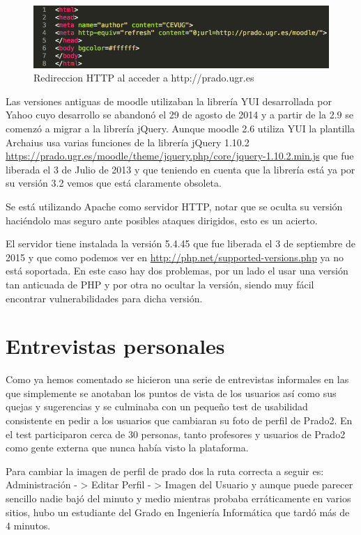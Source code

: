 \begin{figure}
\centering
\includegraphics[width=1.0\textwidth]{../screenshots/redireccionhttp}
\caption{Redireccion HTTP al acceder a http://prado.ugr.es}
\label{redireccionhttp}
\end{figure}

\bigskip
Las versiones antiguas de moodle utilizaban la librería YUI desarrollada por Yahoo cuyo desarrollo se abandonó el 29 de agosto de 2014 \cite{art_01} y a partir de la 2.9 se comenzó a migrar a la librería jQuery. Aunque moodle 2.6 utiliza YUI la plantilla Archaius usa varias funciones de la librería jQuery 1.10.2 \url{https://prado.ugr.es/moodle/theme/jquery.php/core/jquery-1.10.2.min.js} que fue liberada el 3 de Julio de 2013 y que teniendo en cuenta que la librería está ya por su versión 3.2 vemos que está claramente obsoleta.

\bigskip
Se está utilizando Apache como servidor HTTP, notar que se oculta su versión haciéndolo mas seguro ante posibles ataques dirigidos, esto es un acierto.

\bigskip
El servidor tiene instalada la versión 5.4.45 que fue liberada el 3 de septiembre de 2015 y que como podemos ver en \url{http://php.net/supported-versions.php} ya no está soportada. En este caso hay dos problemas, por un lado el usar una versión tan anticuada de PHP y por otra no ocultar la versión, siendo muy fácil encontrar vulnerabilidades para dicha versión.

\section{Entrevistas personales}

Como ya hemos comentado se hicieron una serie de entrevistas informales en las que simplemente se anotaban los puntos de vista de los usuarios así como sus quejas y sugerencias y se culminaba con un pequeño test de usabilidad consistente en pedir a los usuarios que cambiaran su foto de perfil de Prado2. En el test participaron cerca de 30 personas, tanto profesores y usuarios de Prado2 como gente externa que nunca había visto la plataforma.

\bigskip
Para cambiar la imagen de perfil de prado dos la ruta correcta a seguir es: Administración - > Editar Perfil - > Imagen del Usuario y aunque puede parecer sencillo nadie bajó del minuto y medio mientras probaba erráticamente en varios sitios, hubo un estudiante del Grado en Ingeniería Informática que tardó más de 4 minutos.


